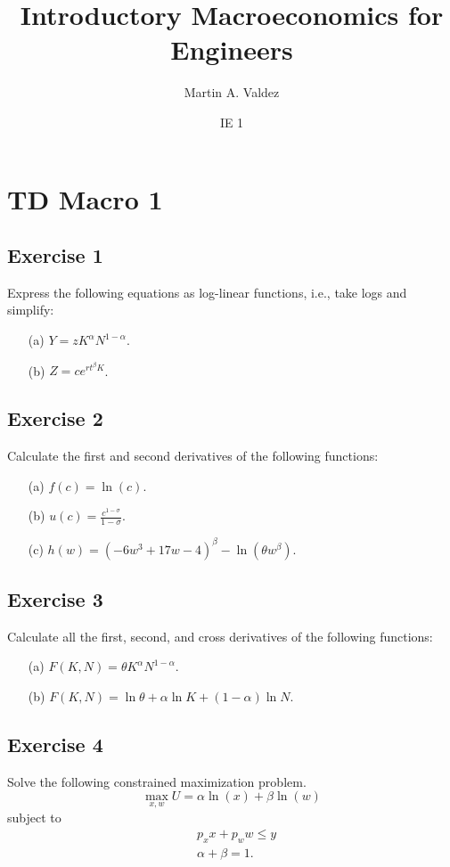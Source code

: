 \documentclass[11pt]{article}
\title{Introductory Macroeconomics for Engineers}
\author{Martin A. Valdez}
\date{IE 1}
\begin{document}
\maketitle

\section*{TD Macro 1}

\subsection*{Exercise 1}
Express the following equations as log-linear functions, i.e., take logs and simplify:
\begin{enumerate}
    \item[(a)] $Y = zK^\alpha N^{1-\alpha}$.
    \item[(b)] $Z = ce^{rt^\beta K}$.
\end{enumerate}

\subsection*{Exercise 2}
Calculate the first and second derivatives of the following functions:
\begin{enumerate}
    \item[(a)] $f(c) = \ln(c)$.
    \item[(b)] $u(c) = \frac{c^{1-\sigma}}{1-\sigma}$.
    \item[(c)] $h(w) = (-6w^3 + 17w - 4)^\beta - \ln(\theta w^\beta)$.
\end{enumerate}

\subsection*{Exercise 3}
Calculate all the first, second, and cross derivatives of the following functions:
\begin{enumerate}
    \item[(a)] $F(K, N) = \theta K^\alpha N^{1-\alpha}$.
    \item[(b)] $F(K, N) = \ln \theta + \alpha \ln K + (1 - \alpha) \ln N$.
\end{enumerate}

\subsection*{Exercise 4}
Solve the following constrained maximization problem. 
\[
\max_{x,w} U = \alpha \ln(x) + \beta \ln(w) 
\]
subject to
\begin{align*}
    &p_x x + p_w w \leq y 
\\
&\alpha + \beta = 1.
\end{align*}
\end{document}

